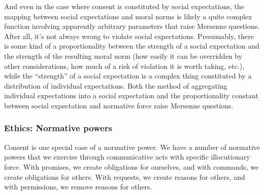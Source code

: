 And even in the case where consent is constituted by social expectations, the mapping between social expectations 
and moral norms is likely a quite complex function involving apparently arbitrary parameters that raise Mersenne
questions. After all, it's not always wrong to violate social expectations. Presumably, there is some kind of a
proportionality between the strength of a social expectation and the strength of the resulting moral norm (how
easily it can be overridden by other considerations, how much of a risk of violation it is worth taking, etc.),
while the ``strength'' of a social expectation is a complex thing constituted by a distribution of individual
expectations. Both the method of aggregating individual expectations into a social expectation and the proportionality
constant between social expectation and normative force raise Mersenne questions.

\subsubsection{Ethics: Normative powers}
Consent is one special case of a normative power.
We have a number of normative powers that we exercise through communicative acts with specific illocutionary force.
With promises, we create obligations for ourselves, and with commands, we create obligations
for others. With requests, we create reasons for others, and with permissions, we remove reasons for others. 

